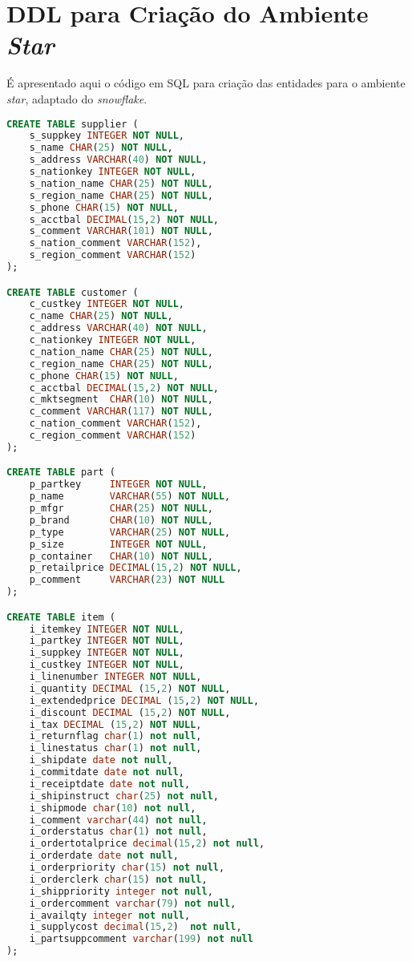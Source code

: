 
\chapter{DDL para Criação do Ambiente \textit{Star}}
\label{ddl_star}

É apresentado aqui o código em SQL para criação das entidades para o ambiente \textit{star}, adaptado do \textit{snowflake}. 

\begin{lstlisting}[language=SQL]
CREATE TABLE supplier (
	s_suppkey INTEGER NOT NULL,
	s_name CHAR(25) NOT NULL,
	s_address VARCHAR(40) NOT NULL,
	s_nationkey INTEGER NOT NULL,
	s_nation_name CHAR(25) NOT NULL,
	s_region_name CHAR(25) NOT NULL,
	s_phone CHAR(15) NOT NULL,
	s_acctbal DECIMAL(15,2) NOT NULL,
	s_comment VARCHAR(101) NOT NULL,
	s_nation_comment VARCHAR(152),
	s_region_comment VARCHAR(152)
);

CREATE TABLE customer (
	c_custkey INTEGER NOT NULL,
	c_name CHAR(25) NOT NULL,
	c_address VARCHAR(40) NOT NULL,
	c_nationkey INTEGER NOT NULL,
	c_nation_name CHAR(25) NOT NULL,
	c_region_name CHAR(25) NOT NULL,
	c_phone CHAR(15) NOT NULL,
	c_acctbal DECIMAL(15,2) NOT NULL,
	c_mktsegment  CHAR(10) NOT NULL,
	c_comment VARCHAR(117) NOT NULL,
	c_nation_comment VARCHAR(152),
	c_region_comment VARCHAR(152)
);

CREATE TABLE part ( 
	p_partkey     INTEGER NOT NULL,
	p_name        VARCHAR(55) NOT NULL,
	p_mfgr        CHAR(25) NOT NULL,
	p_brand       CHAR(10) NOT NULL,
	p_type        VARCHAR(25) NOT NULL,
	p_size        INTEGER NOT NULL,
	p_container   CHAR(10) NOT NULL,
	p_retailprice DECIMAL(15,2) NOT NULL,
	p_comment     VARCHAR(23) NOT NULL 
);

CREATE TABLE item (
	i_itemkey INTEGER NOT NULL, 
	i_partkey INTEGER NOT NULL, 
	i_suppkey INTEGER NOT NULL, 
	i_custkey INTEGER NOT NULL, 
	i_linenumber INTEGER NOT NULL, 
	i_quantity DECIMAL (15,2) NOT NULL,
	i_extendedprice DECIMAL (15,2) NOT NULL, 
	i_discount DECIMAL (15,2) NOT NULL, 
	i_tax DECIMAL (15,2) NOT NULL, 
	i_returnflag char(1) not null, 
	i_linestatus char(1) not null,
	i_shipdate date not null,
	i_commitdate date not null, 
	i_receiptdate date not null, 
	i_shipinstruct char(25) not null, 
	i_shipmode char(10) not null,
	i_comment varchar(44) not null,
	i_orderstatus char(1) not null, 
	i_ordertotalprice decimal(15,2) not null, 
	i_orderdate date not null, 
	i_orderpriority char(15) not null,
	i_orderclerk char(15) not null,
	i_shippriority integer not null, 
	i_ordercomment varchar(79) not null, 
	i_availqty integer not null, 
	i_supplycost decimal(15,2)  not null, 
	i_partsuppcomment varchar(199) not null
);
		
\end{lstlisting}


	

